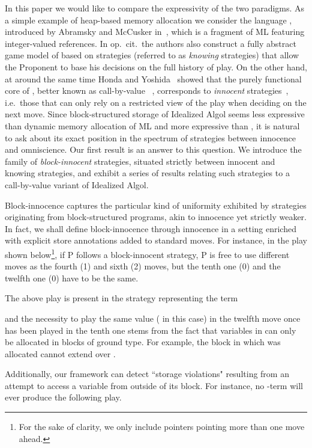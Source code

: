 \documentclass{CSML}
\theoremstyle{definition}\newtheorem{definition}[thm]{Definition}
\theoremstyle{definition}\newtheorem{example}[thm]{Example}
\theoremstyle{definition}\newtheorem{proposition}[thm]{Proposition}
\theoremstyle{definition}\newtheorem{lemma}[thm]{Lemma}
\theoremstyle{definition}\newtheorem{theorem}[thm]{Theorem}
\theoremstyle{definition}\newtheorem{corollary}[thm]{Corollary}
\theoremstyle{definition}\newtheorem{remark}[thm]{Remark}
\begin{document}
In this paper we would like to compare the expressivity of the two paradigms.
As a simple example of heap-based memory allocation we consider
the language , introduced by Abramsky and McCusker in~\cite{AM97b},
which is a fragment of ML featuring integer-valued references.  In op.~cit.\ the authors
also construct a fully abstract game model of 
based on strategies (referred to as \emph{knowing} strategies)
that allow the Proponent to base his decisions on the full history of play.
On the other hand, at around the same time Honda and Yoshida~\cite{HY97} showed that the purely functional
core of , better known as call-by-value ~\cite{Plo77}, corresponds to
\emph{innocent} strategies~\cite{HO00}, i.e.\ those that can only
rely on a restricted view of the play when deciding on the next move.
Since block-structured storage of Idealized Algol seems
less expressive than dynamic memory allocation of ML
and more expressive than , it is natural to ask about
its exact position in the spectrum of strategies
between innocence and omniscience.
Our first result is an answer to this question. 
We introduce the family of \emph{block-innocent}
strategies, situated strictly between innocent and knowing strategies, and exhibit a series of results
relating such strategies to a call-by-value variant  of Idealized Algol.

Block-innocence captures the particular kind of uniformity exhibited by
strategies originating from block-structured programs, akin to innocence
yet strictly weaker. In fact, we shall define block-innocence through innocence in
a setting enriched with explicit store annotations added to standard moves.
For instance, in the play shown below\footnote{For the sake of clarity, we only include pointers pointing more
than one move ahead.},
if P follows a block-innocent strategy, P is free to use different moves as the fourth (1) and sixth (2) moves,
but the tenth one (0) and the twelfth one (0) have to be the same.


The above play is present in the strategy representing the term

and the necessity to play the same value ( in this case) in the twelfth move once  has been played in the tenth one
stems from the fact that variables in  can only be allocated in blocks of ground type. For example, the block in which  was allocated cannot extend over .

Additionally, our framework can detect ``storage violations" resulting
from an attempt to access a variable from outside of its block.
For instance, no -term will ever produce the following play.
\end{document}

